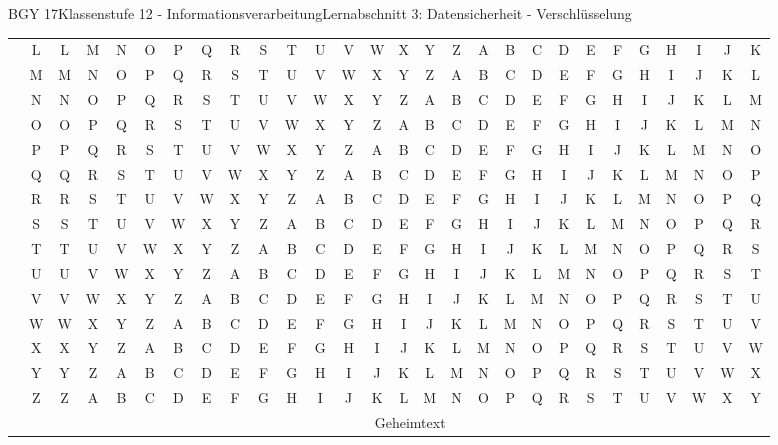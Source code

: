 \documentclass[oneside,openany,headings=optiontotoc,11pt,numbers=noenddot]{scrreprt}
\begin{document}
\begin{worksheet}{BGY 17}{Klassenstufe 12 - Informationsverarbeitung}{Lernabschnitt 3: Datensicherheit - Verschlüsselung}
\begin{landscape}
\begin{tabularx}{1.12\textheight}{c|c||c|c|c|c|c|c|c|c|c|c|c|c|c|c|c|c|c|c|c|c|c|c|c|c|c|c|}
				\cline{2-28}
				& L & L & M & N & O & P & Q & R & S & T & U & V & W & X & Y & Z & A & B & C & D & E & F & G & H & I & J & K\\
				\cline{2-28}
				\rowcolor{gray!15}  & M & M & N & O & P & Q & R & S & T & U & V & W & X & Y & Z & A & B & C & D & E & F & G & H & I & J & K & L\\
				\cline{2-28}
				& N & N & O & P & Q & R & S & T & U & V & W & X & Y & Z & A & B & C & D & E & F & G & H & I & J & K & L & M\\
				\cline{2-28}
				\rowcolor{gray!15}  & O & O & P & Q & R & S & T & U & V & W & X & Y & Z & A & B & C & D & E & F & G & H & I & J & K & L & M & N\\
				\cline{2-28}
				& P & P & Q & R & S & T & U & V & W & X & Y & Z & A & B & C & D & E & F & G & H & I & J & K & L & M & N & O\\
				\cline{2-28}
				\rowcolor{gray!15}  & Q & Q & R & S & T & U & V & W & X & Y & Z & A & B & C & D & E & F & G & H & I & J & K & L & M & N & O & P\\
				\cline{2-28}
				& R & R & S & T & U & V & W & X & Y & Z & A & B & C & D & E & F & G & H & I & J & K & L & M & N & O & P & Q\\
				\cline{2-28}
				\rowcolor{gray!15}  & S & S & T & U & V & W & X & Y & Z & A & B & C & D & E & F & G & H & I & J & K & L & M & N & O & P & Q & R\\
				\cline{2-28}
				& T & T & U & V & W & X & Y & Z & A & B & C & D & E & F & G & H & I & J & K & L & M & N & O & P & Q & R & S\\
				\cline{2-28}
				\rowcolor{gray!15}  & U & U & V & W & X & Y & Z & A & B & C & D & E & F & G & H & I & J & K & L & M & N & O & P & Q & R & S & T\\
				\cline{2-28}
				& V & V & W & X & Y & Z & A & B & C & D & E & F & G & H & I & J & K & L & M & N & O & P & Q & R & S & T & U\\
				\cline{2-28}
				\rowcolor{gray!15}  & W & W & X & Y & Z & A & B & C & D & E & F & G & H & I & J & K & L & M & N & O & P & Q & R & S & T & U & V\\
				\cline{2-28}
				& X & X & Y & Z & A & B & C & D & E & F & G & H & I & J & K & L & M & N & O & P & Q & R & S & T & U & V & W\\
				\cline{2-28}
				\rowcolor{gray!15}  & Y & Y & Z & A & B & C & D & E & F & G & H & I & J & K & L & M & N & O & P & Q & R & S & T & U & V & W & X\\
				\cline{2-28}
				\multirow{-26}{*}{\RotText{Schlüssel}} & Z & Z & A & B & C & D & E & F & G & H & I & J & K & L & M & N & O & P & Q & R & S & T & U & V & W & X & Y\\
				\cline{2-28}
				\multicolumn{2}{c||}{} & \multicolumn{26}{|c|}{Geheimtext}
			\end{tabularx}
		\end{landscape}
	\end{worksheet}
\end{document}
